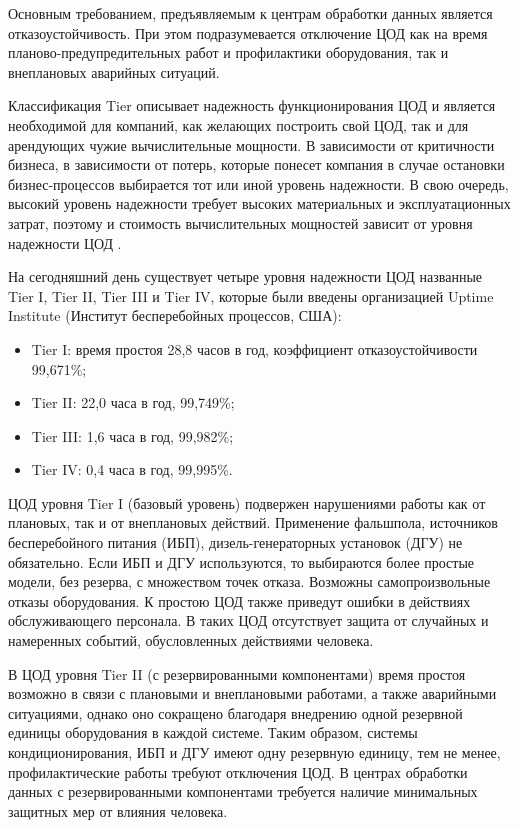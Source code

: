 Основным требованием, предъявляемым к центрам обработки данных является отказоустойчивость.
При этом подразумевается отключение ЦОД как на время планово-предупредительных работ и профилактики оборудования, так и внеплановых аварийных ситуаций.

Классификация Tier описывает надежность функционирования ЦОД и является необходимой для компаний, как желающих построить свой ЦОД, так и для арендующих чужие вычислительные мощности.
В зависимости от критичности бизнеса, в зависимости от потерь, которые понесет компания в случае остановки бизнес-процессов выбирается тот или иной уровень надежности.
В свою очередь, высокий уровень надежности требует высоких материальных и эксплуатационных затрат, поэтому и стоимость вычислительных мощностей зависит от уровня надежности ЦОД \cite{dc-tier}.

На сегодняшний день существует четыре уровня надежности ЦОД названные Tier I, Tier II, Tier III и Tier IV, которые были введены организацией Uptime Institute (Институт бесперебойных процессов, США):
\begin{itemize}
  \item Tier I: время простоя 28,8 часов в год, коэффициент отказоустойчивости 99,671\%;
  \item Tier II: 22,0 часа в год, 99,749\%;
  \item Tier III: 1,6 часа в год, 99,982\%;
  \item Tier IV: 0,4 часа в год, 99,995\%.
\end{itemize}

ЦОД уровня Tier I (базовый уровень) подвержен нарушениями работы как от плановых, так и от внеплановых действий.
Применение фальшпола, источников бесперебойного питания (ИБП), дизель-генераторных установок (ДГУ) не обязательно.
Если ИБП и ДГУ используются, то выбираются более простые модели, без резерва, с множеством точек отказа.
Возможны самопроизвольные отказы оборудования.
К простою ЦОД также приведут ошибки в действиях обслуживающего персонала.
В таких ЦОД отсутствует защита от случайных и намеренных событий, обусловленных действиями человека.

В ЦОД уровня Tier II (с резервированными компонентами) время простоя возможно в связи с плановыми и внеплановыми работами, а также аварийными ситуациями, однако оно сокращено благодаря внедрению одной резервной единицы оборудования в каждой системе.
Таким образом, системы кондиционирования, ИБП и ДГУ имеют одну резервную единицу, тем не менее, профилактические работы требуют отключения ЦОД.
В центрах обработки данных с резервированными компонентами требуется наличие минимальных защитных мер от влияния человека.

